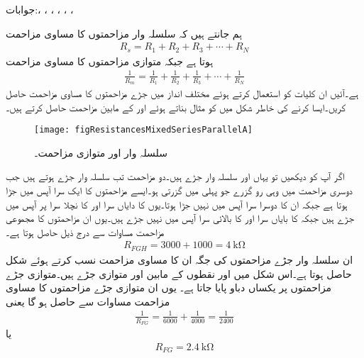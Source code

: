 جوابات:، ، ، ، ، ، 
\FloatBarrier


ہم جانتے ہیں کہ سلسلہ وار مزاحمتوں کا مساوی مزاحمت
\begin{align}\label{مساوات_مزاحمتی_سلسلہ_وار_دوبارہ}
R_s=R_1+R_2+R_3+\cdots+R_N
\end{align}
ہوتا ہے جبکہ متوازی مزاحمتوں کا مساوی مزاحمت
\begin{align}\label{مساوات_مزاحمتی_متوازی_دوبارہ}
\frac{1}{R_m}=\frac{1}{R_1}+\frac{1}{R_2}+\frac{1}{R_3}+\cdots+\frac{1}{R_N}
\end{align}
ہے۔آئیں ان کلیات کو استعمال کرتے ہوئے مختلف انداز میں جڑے مزاحمتوں کا مساوی مزاحمت حاصل کریں۔ایسا کرنے کی خاطر شکل  میں کو مثال بناتے ہوئے  اور  کے مابین مزاحمت  حاصل کرتے ہیں۔
\begin{figure}
\centering
\texttt{[image: figResistancesMixedSeriesParallelA]}
\caption{سلسلہ وار اور متوازی مزاحمت۔}
\label{مشق_مزاحمتی_سلسلہ_وار_متوازی_مزاحمت}
\end{figure}

اگر آپ  کو دیکھیں تو  یہاں  اور  سلسلہ وار جڑے ہیں۔دو مزاحمت تب سلسلہ وار جڑے ہوتے ہیں جب دوسری مزاحمت میں وہی رو گزرے جو پہلی میں گزرتی ہو۔ایسے مزاحمتوں کا ایک سرا آپس میں جڑا ہوتا ہے جبکہ ان کا دوسرا سرا آپس میں نہیں جڑا ہوتا۔یوں  کا دایاں سرا اور  کا نچلا سرا  پر آپس میں جڑے ہیں جبکہ  کا بایاں سرا اور  کا بالائی سرا آپس میں نہیں جڑے ہیں۔یوں ان مزاحمتوں کا مجموعی مزاحمت مساوات  سے درج ذیل حاصل ہوتا ہے۔
\begin{align*}
R_{FGH}=3000+1000=\SI{4}{\kilo\ohm}
\end{align*}
ان سلسلہ وار جڑے مزاحمتوں کی جگہ ان کا مساوی مزاحمت  نسب کرتے ہوئے شکل  حاصل ہوتا ہے۔اس شکل میں  اور  نقطوں کے مابین  اور  متوازی جڑے ہیں۔متوازی جڑے مزاحمتوں پر یکساں دباو پایا جاتا ہے۔ یوں ان متوازی جڑے مزاحمتوں کا مساوی مزاحمت مساوات  سے حاصل ہو گا یعنی 
\begin{align*}
\frac{1}{R_{FG}}=\frac{1}{6000}+\frac{1}{4000}=\frac{1}{2400}
\end{align*}
یا
\begin{align*}
R_{FG}=\SI{2.4}{\kilo\ohm}
\end{align*}

